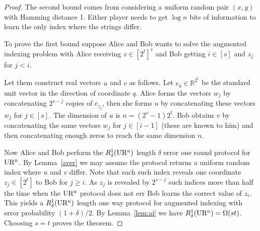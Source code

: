 \begin{proof}
The second bound comes from considering a uniform random pair $(x,y)$ with
Hamming distance 1. Either player needs to get $\log n$ bits of information to
learn the only index where the strings differ.

To prove the first bound suppose Alice and Bob wants to
solve the augmented indexing problem with Alice receiving $z\in[2^t]^s$ and Bob
getting $i\in [s]$ and $z_j$ for $j<i$.

Let them construct real vectors $u$ and
$v$ as follows. Let $e_q\in\mathbb R^{2^t}$
be the standard unit vector in the direction of coordinate $q$. Alice forms
the vectors $w_j$ by concatenating $2^{s-j}$ copies of $e_{z_j}$, then she
forms $u$ by concatenating these vectors $w_j$ for
$j\in[s]$. The dimension of $u$ is $n=(2^s-1)2^t$. Bob
obtains $v$ by concatenating the same vectors $w_j$ for $j\in[i-1]$ (these are
known to him) and then
concatenating enough zeros to reach the same dimension
$n$.

Now Alice and Bob perform the $R^1_\delta(\operatorname{UR^n})$ length
$\delta$ error one round protocol for $\operatorname{UR^n}$. By Lemma~\ref{aver} we
may assume the protocol returns a uniform random index where $u$ and $v$
differ. Note that each such index reveals one coordinate $z_j\in[2^t]$ to Bob
for $j\ge i$. As $z_j$ is revealed by $2^{s-j}$ such indices more than half the
time when the $\operatorname{UR^n}$ protocol does not err Bob learns the correct value of
$z_i$. This yields a $R^1_\delta(\operatorname{UR^n})$ length one way protocol for augmented
indexing with error probability $(1+\delta)/2$. By Lemma~\ref{lem:ai} we have
$R^1_\delta(\operatorname{UR^n})=\Omega(st)$. Choosing $s=t$ proves the theorem.
\end{proof}

